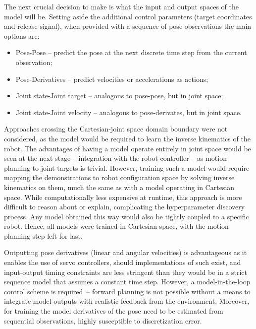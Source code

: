 \documentclass{article}
\begin{document}
The next crucial decision to make is what the input and output spaces of the model will be. Setting aside the additional control parameters (target coordinates and release signal), when provided with a sequence of pose observations the main options are:
\begin{itemize}
	\item Pose-Pose -- predict the pose at the next discrete time step from the current observation;
	\item Pose-Derivatives -- predict velocities or accelerations as actions;
	\item Joint state-Joint target -- analogous to pose-pose, but in joint space;
	\item Joint state-Joint velocity -- analogous to pose-derivates, but in joint space.
\end{itemize}

Approaches crossing the Cartesian-joint space domain boundary were not considered, as the model would be required to learn the inverse kinematics of the robot. The advantages of having a model operate entirely in joint space would be seen at the next stage -- integration with the robot controller -- as motion planning to joint targets is trivial. However, training such a model would require mapping the demonstrations to robot configuration space by solving inverse kinematics on them, much the same as with a model operating in Cartesian space. While computationally less expensive at runtime, this approach is more difficult to reason about or explain, complicating the hyperparameter discovery process. Any model obtained this way would also be tightly coupled to a specific robot. Hence, all models were trained in Cartesian space, with the motion planning step left for last.

Outputting pose derivatives (linear and angular velocities) is advantageous as it enables the use of servo controllers, should implementations of such exist, and input-output timing constraints are less stringent than they would be in a strict sequence model that assumes a constant time step. However, a model-in-the-loop control scheme is required~-- forward planning is not possible without a means to integrate model outputs with realistic feedback from the environment. Moreover, for training the model derivatives of the pose need to be estimated from sequential observations, highly susceptible to discretization error. 
\end{document}
